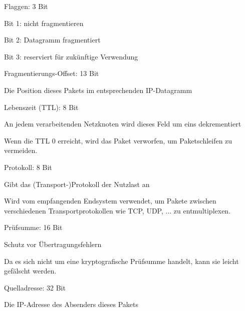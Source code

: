 \documentclass[a4paper]{article}
\begin{document}
\begin{multicols}{3}
\begin{itemize*}
\begin{itemize*}
            \end{itemize*}
            \item Flaggen: 3 Bit
            \begin{itemize*}
                  \item Bit 1: nicht fragmentieren
                  \item Bit 2: Datagramm fragmentiert
                  \item Bit 3: reserviert für zukünftige Verwendung
            \end{itemize*}
            \item Fragmentierungs-Offset: 13 Bit
            \begin{itemize*}
                  \item Die Position dieses Pakets im entsprechenden IP-Datagramm
            \end{itemize*}
            \item Lebenszeit (TTL): 8 Bit
            \begin{itemize*}
                  \item An jedem verarbeitenden Netzknoten wird dieses Feld um eins dekrementiert
                  \item Wenn die TTL 0 erreicht, wird das Paket verworfen, um Paketschleifen zu vermeiden.
            \end{itemize*}
            \item Protokoll: 8 Bit
            \begin{itemize*}
                  \item Gibt das (Transport-)Protokoll der Nutzlast an
                  \item Wird vom empfangenden Endsystem verwendet, um Pakete zwischen verschiedenen Transportprotokollen wie TCP, UDP, ... zu entmultiplexen.
            \end{itemize*}
            \item Prüfsumme: 16 Bit
            \begin{itemize*}
                  \item Schutz vor Übertragungsfehlern
                  \item Da es sich nicht um eine kryptografische Prüfsumme handelt, kann sie leicht gefälscht werden.
            \end{itemize*}
            \item Quelladresse: 32 Bit
            \begin{itemize*}
                  \item Die IP-Adresse des Absenders dieses Pakets

\end{itemize*}
\end{itemize*}
\end{multicols}
\end{document}
